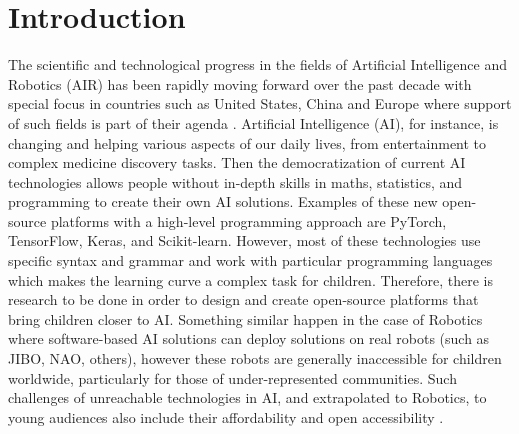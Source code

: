 \documentclass[sigconf]{acmart}
\begin{document}



\maketitle

\section{Introduction} 

\lipsum[2]

The scientific and technological progress in the fields of Artificial Intelligence and Robotics (AIR) has been rapidly moving forward over the past decade with special focus in countries such as United States, China and Europe where support of such fields is part of their agenda \cite{Savage2020}. 
Artificial Intelligence (AI), for instance, is changing and helping various aspects of our daily lives, from entertainment to complex medicine discovery tasks. 
Then the democratization of current AI technologies allows people without in-depth skills in maths, statistics, and programming to create their own AI solutions. Examples of these new open-source platforms with a high-level programming approach are PyTorch, TensorFlow, Keras, and Scikit-learn. 
However, most of these technologies use specific syntax and grammar and work with particular programming languages which makes the learning curve a complex task for children. 
Therefore, there is research to be done in order to design and create open-source platforms that bring children closer to AI.
Something similar happen in the case of Robotics where software-based AI solutions can deploy solutions on real robots (such as JIBO, NAO, others), however these robots are generally inaccessible for children worldwide, particularly for those of under-represented communities.
Such challenges of unreachable technologies in AI, and extrapolated to Robotics, to young audiences 
also include their affordability and open accessibility \cite{UNICEF2020}.
\end{document}
